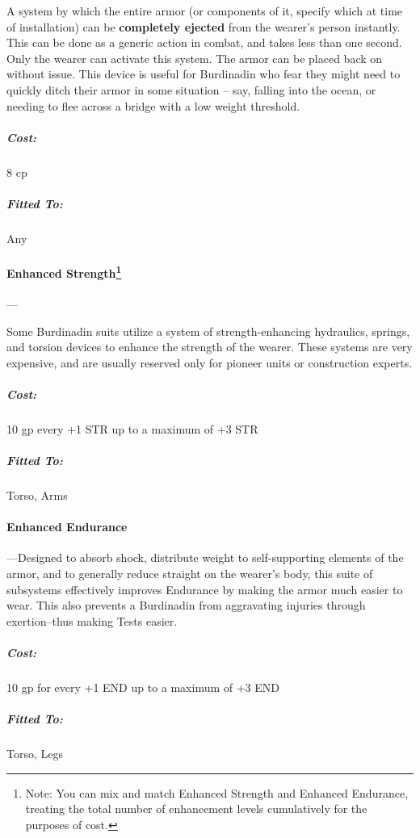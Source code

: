 \documentclass[oneside,11pt,english]{book}
\begin{document}
A system by which the entire armor (or components of it, specify which at time
of installation) can be \textbf{completely ejected} from the wearer’s person
instantly. This can be done as a generic action in combat, and takes less than
one second. Only the wearer can activate this system. The armor can be placed
back on without issue. This device is useful for Burdinadin who fear they might
need to quickly ditch their armor in some situation -- say, falling into the
ocean, or needing to flee across a bridge with a low weight threshold.
\vspace{-15pt}\subparagraph{Cost:} 8 cp
\vspace{-15pt}\subparagraph{Fitted To:} Any

\paragraph[Enhanced Strength]{Enhanced Strength\footnote{Note: You can mix and
    match Enhanced Strength and Enhanced Endurance, treating the total number of
    enhancement levels cumulatively for the purposes of cost.} }--- 

Some Burdinadin suits utilize a system of strength-enhancing hydraulics, springs, and torsion devices to 
enhance the strength of the wearer. These systems are very expensive, and are usually reserved only for 
pioneer units or construction experts. 
\vspace{-15pt}\subparagraph{Cost:} 10 gp every +1 STR up to a maximum of +3 STR 
\vspace{-15pt}\subparagraph{Fitted To:} Torso, Arms

\paragraph[Enhanced Endurance]{Enhanced Endurance\footnotemark[\value{footnote}] }--- 
Designed to absorb shock, distribute weight to self-supporting elements of the armor, and to generally 
reduce straight on the wearer’s body, this suite of subsystems effectively improves Endurance by making 
the armor much easier to wear. This also prevents a Burdinadin from aggravating injuries through 
exertion--thus making  Tests easier. 
\vspace{-15pt}\subparagraph{Cost:} 10 gp for every +1 END up to a maximum of +3 END 
\vspace{-15pt}\subparagraph{Fitted To:} Torso, Legs 
\end{document}
